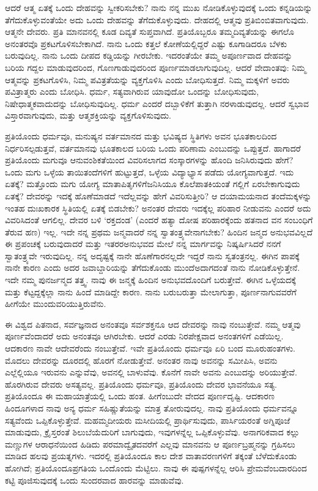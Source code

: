 ಆದರೆ ಆತ್ಮ ಏತಕ್ಕೆ ಒಂದು ದೇಹವನ್ನು ಸ್ವೀಕರಿಸಬೇಕು? ನಾನು ನನ್ನ ಮುಖ ನೋಡಿಕೊಳ್ಳುವುದಕ್ಕೆ ಒಂದು ಕನ್ನಡಿಯನ್ನು ತೆಗೆದುಕೊಳ್ಳುವಂತೆಯೇ ಅದು ಒಂದು ದೇಹವನ್ನು ತೆಗೆದುಕೊಳ್ಳುವುದು. ದೇಹದಲ್ಲಿ ಆತ್ಮವು ಪ್ರತಿಬಿಂಬಿತವಾಗುವುದು. ಆತ್ಮನೇ ದೇವರು. ಪ್ರತಿ ಮಾನವನಲ್ಲಿ ಕೂಡ ದಿವ್ಯತೆ ಸುಪ್ತವಾಗಿದೆ. ಪ್ರತಿಯೊಬ್ಬರೂ ತಮ್ಮ\break ದಿವ್ಯತೆಯನ್ನು ಈಗಲೊ ಅನಂತರವೊ ಪ್ರಕಟಗೊಳಿಸಬೇಕಾಗಿದೆ. ನಾನು ಒಂದು ಕತ್ತಲೆ ಕೋಣೆಯಲ್ಲಿದ್ದರೆ ಎಷ್ಟು ಕೂಗಾಡಿದರೂ ಬೆಳಕು ಬರುವುದಿಲ್ಲ. ನಾನು ಒಂದು ದೀಪದ ಕಡ್ಡಿಯನ್ನು ಗೀರಬೇಕು. ಇದರಂತೆಯೇ ತಮ್ಮ ಅಪೂರ್ಣವಾದ ದೇಹವನ್ನು ಬರಿಯ ಗದ್ದಲ ಮಾಡುವುದರಿಂದ, ಗೊಣಗಾಡುವುದರಿಂದ ಪೂರ್ಣಮಾಡಲಾಗುವುದಿಲ್ಲ. ಆದರೆ ವೇದಾಂತವು: ನಿಮ್ಮ ಆತ್ಮವನ್ನು ಪ್ರಕಟಗೊಳಿಸಿ, ನಿಮ್ಮ ಪವಿತ್ರತೆಯನ್ನು ವ್ಯಕ್ತಗೊಳಿಸಿ ಎಂದು ಬೋಧಿಸುತ್ತದೆ. ನಿಮ್ಮ ಮಕ್ಕಳಿಗೆ ಅವರು ಪವಿತ್ರಾತ್ಮರು ಎಂದು ಬೋಧಿಸಿ. ಧರ್ಮ, ಸತ್ಯವಾಗಿರುವ ಯಾವುದೋ ಒಂದನ್ನು ಬೋಧಿಸುವುದು, ನಿಷೇಧಾತ್ಮಕವಾದುದನ್ನು ಬೋಧಿಸುವುದಿಲ್ಲ. ಧರ್ಮ ಎಂದರೆ ದಬ್ಬಾಳಿಕೆಗೆ ತುತ್ತಾಗಿ ನರಳಾಡುವುದಲ್ಲ. ಆದರೆ ಸ್ವಭಾವ ವಿಸ್ತಾರವಾಗುವುದು, ಮತ್ತು ಆತ್ಮಶಕ್ತಿಯನ್ನು ವ್ಯಕ್ತಗೊಳಿಸುವುದು.

ಪ್ರತಿಯೊಂದು ಧರ್ಮವೂ, ಮನುಷ್ಯನ ವರ್ತಮಾನದ ಮತ್ತು ಭವಿಷ್ಯದ ಸ್ಥಿತಿಗಳು ಅವನ ಭೂತಕಾಲದಿಂದ ನಿರ್ಧರಿಸಲ್ಪಡುತ್ತವೆ, ವರ್ತಮಾನವು ಭೂತಕಾಲದ ಬರಿಯ ಒಂದು ಪರಿಣಾಮ ಎಂಬುದನ್ನು ಒಪ್ಪುತ್ತದೆ. ಹಾಗಾದರೆ ಪ್ರತಿಯೊಂದು ಮಗುವೂ ಆನುವಂಶಿಕತೆಯಿಂದ ವಿವರಿಸಲಾಗದ ಸಂಸ್ಕಾರಗಳನ್ನು ಹೊಂದಿ ಜನಿಸಿರುವುದು ಹೇಗೆ? ಒಂದು ಮಗು ಒಳ್ಳೆಯ ತಾಯಿತಂದೆಗಳಿಗೆ ಹುಟ್ಟುತ್ತದೆ, ಒಳ್ಳೆಯ ವಿದ್ಯಾಭ್ಯಾಸ ಪಡೆದು ಯೋಗ್ಯವಾಗುತ್ತದೆ. ಇದು ಏತಕ್ಕೆ? ಮತ್ತೊಂದು ಮಗು ಯೋಗ್ಯ ಮಾತಾಪಿತೃಗಳಿಗೆ\break ಜನಿಸಿಯೂ ಕೊಲೆಪಾತಕಿಯಂತೆ ಗಲ್ಲಿಗೆ ಏರಬೇಕಾಗುವುದು ಏತಕ್ಕೆ? ದೇವರನ್ನು ಇದಕ್ಕೆ ಹೊಣೆಮಾಡದೆ ಇದೆಲ್ಲವನ್ನು ಹೇಗೆ ವಿವರಿಸುತ್ತೀರಿ? ಆ ದಯಾಮಯನಾದ ತಂದೆ\break ಮಕ್ಕಳನ್ನು ಇಂತಹ ದುಃಖಕಾರಕ ಸ್ಥಿತಿಯಲ್ಲಿ ಏತಕ್ಕೆ ಬಿಡಬೇಕು? ಅನಂತರ ದೇವರು ಇದಕ್ಕೆಲ್ಲ ಪರಿಹಾರ ನೀಡುವನು ಎಂದರೆ ಅದು ವಿವರಿಸಿದಂತೆ ಆಗಲಿಲ್ಲ. ದೇವರ ಬಳಿ ‘ರಕ್ತದಂಡ’ (ಎಂದರೆ ಹತ್ಯಾ ದೋಷ ಪರಿಹಾರಕ್ಕೆಂದು ಹತನಾದ ವನ ಸಂಬಂಧಿಗೆ ತೆರುವ ಹಣ) ಇಲ್ಲ. ಇದೇ ನನ್ನ ಪ್ರಥಮ ಜನ್ಮವಾದರೆ ನನ್ನ ಸ್ವಾತಂತ್ರ್ಯವೇನಾಗಬೇಕು? ಹಿಂದಿನ ಜನ್ಮದ ಅನುಭವವಿಲ್ಲದೆ ಈ ಪ್ರಪಂಚಕ್ಕೆ ಬರುವುದಾದರೆ ಮತ್ತು ಇತರರ\break ಅನುಭವದ ಮೇಲೆ ನನ್ನ ಮಾರ್ಗವನ್ನು ನಿಷ್ಕರ್ಷಿಸಿದರೆ ನನಗೆ ಸ್ವಾತಂತ್ರ್ಯವೇ ಇರುವುದಿಲ್ಲ. ನನ್ನ ಅದೃಷ್ಟಕ್ಕೆ ನಾನೇ ಹೊಣೆಗಾರನಲ್ಲದೇ ಇದ್ದರೆ ನಾನು ಸ್ವತಂತ್ರನಲ್ಲ. ಈಗಿನ ಪಾಪಕ್ಕೆ ನಾನೇ ಕಾರಣ ಎಂದು ಅದರ ಜವಾಬ್ದಾರಿಯನ್ನು ತೆಗೆದುಕೊಂಡು ಮುಂದೆ\break ಅದಾಗದಂತೆ ನಾನು ನೋಡಿಕೊಳ್ಳುತ್ತೇನೆ. ಇದೇ ನಮ್ಮ ಪುನರ್ಜನ್ಮದ ತತ್ತ್ವ. ನಾವು ಈ ಜನ್ಮಕ್ಕೆ ಹಿಂದಿನ ಅನುಭವದೊಂದಿಗೆ ಬರುತ್ತೇವೆ. ಈಗಿನ ಒಳ್ಳೆಯದಕ್ಕೆ ಮತ್ತು ಕೆಟ್ಟದ್ದಕ್ಕೆಲ್ಲಾ ನಾನು ಹಿಂದೆ ಮಾಡಿದ್ದೇ ಕಾರಣ. ನಾನು ಬರುಬರುತ್ತಾ ಮೇಲಾಗುತ್ತಾ, ಪೂರ್ಣನಾಗುವವರೆಗೆ ಹೀಗೆಯೇ ಮುಂದುವರಿಯುತ್ತಿರುವೆನು.

ಈ ವಿಶ್ವದ ಪಿತನಾದ, ಸರ್ವಜ್ಞನಾದ ಅನಂತವೂ ಸರ್ವಶಕ್ತನೂ ಆದ ದೇವರನ್ನು ನಾವು ನಂಬುತ್ತೇವೆ. ನಮ್ಮ ಆತ್ಮವು ಪೂರ್ಣವೆಂದಾದರೆ ಅದು ಅನಂತವೂ ಆಗಿರಬೇಕು. ಆದರೆ ಎರಡು ನಿರಪೇಕ್ಷವಾದ ಅನಂತಗಳಿಗೆ ಎಡೆಯಿಲ್ಲ. ಆದಕಾರಣ ನಾವೇ ಆ\break ದೇವರೆಂದು ನಂಬುತ್ತೇವೆ. ಇವೇ ಪ್ರತಿಯೊಂದು ಧರ್ಮವೂ ಏರಿ ಬಂದ ಮೂರು\break ಹಂತಗಳು. ಮೊದಲು ದೇವರನ್ನು ದೂರದಲ್ಲಿ ಹೊರಗೆ ನೋಡುತ್ತೇವೆ. ಅನಂತರ ನಾವು ಅವನನ್ನು ಸಮೀಪಿಸಿ, ಅವನು ಎಲ್ಲೆಲ್ಲಿಯೂ ಇರುವನು ಎನ್ನುವೆವು, ಅವನಲ್ಲಿ ಬಾಳುವೆವು. ಕೊನೆಗೆ ನಾವೇ ಅವನು ಎಂಬುದನ್ನು ಅರಿಯುತ್ತೇವೆ. ಹೊರಗಿರುವ ದೇವರು ಅಸತ್ಯವಲ್ಲ. ಪ್ರತಿಯೊಂದು ಧರ್ಮವೂ, ಪ್ರತಿಯೊಂದು ದೇವರ ಭಾವನೆಯೂ ಸತ್ಯ. ಪ್ರತಿಯೊಂದೂ ಈ ಮಹಾಯಾತ್ರೆಯಲ್ಲಿ ಒಂದು ಹಂತ. ಹೀಗೆಂಬುದೇ ವೇದದ ಪೂರ್ಣದೃಷ್ಟಿ. ಆದಕಾರಣ ಹಿಂದೂಗಳಾದ ನಾವು ಅನ್ಯ ಧರ್ಮ ಸಹಿಷ್ಣುತೆಯನ್ನು ಮಾತ್ರ ತೋರುವುದಲ್ಲ. ನಾವು ಪ್ರತಿಯೊಂದು ಧರ್ಮವನ್ನೂ ಸತ್ಯವೆಂದು ಒಪ್ಪಿಕೊಳ್ಳುತ್ತೇವೆ. ಮಹಮ್ಮದೀಯರು ಮಸೀದಿಯಲ್ಲಿ ಪ್ರಾರ್ಥಿಸುವುದು, ಪಾರ್ಸಿಯರಂತೆ ಅಗ್ನಿಪೂಜೆ ಮಾಡುವುದು, ಕ್ರೈಸ್ತರಂತೆ ಶಿಲುಬೆಯೆದುರಿಗೆ ಬಾಗುವುದು, ಇವುಗಳನ್ನೆಲ್ಲ ಒಪ್ಪಿಕೊಳ್ಳುವೆವು. ಅನಾಗರಿಕವಾದ ಕಲ್ಲು ಮಣ್ಣುಗಳ ಆರಾಧನೆಯಿಂದ ಹಿಡಿದು ಪರಮಾದ್ವೈತದವರೆಗೆ ಎಲ್ಲವು ಮಾನವನು ಆ ಪೂರ್ಣಬ್ರಹ್ಮನನ್ನು ಗ್ರಹಿಸಲು ಮಾಡಿದ ಹಲವು ಪ್ರಯತ್ನಗಳು. ಇದರಲ್ಲಿ ಪ್ರತಿಯೊಂದೂ ಕಾಲ ದೇಶ ವಾತಾವರಣಗಳಿಗೆ ತಕ್ಕಂತೆ ಬೆಳೆದುಕೊಂಡು ಹೋಗಿದೆ; ಪ್ರತಿಯೊಂದೂ\break ಪ್ರಗತಿಯ ಒಂದೊಂದು ಮೆಟ್ಟಿಲು. ನಾವು ಈ ಪುಷ್ಪಗಳನ್ನೆಲ್ಲ ಆರಿಸಿ ಪ್ರೇಮವೆಂಬ\break ದಾರದಿಂದ ಕಟ್ಟಿ ಪೂಜಿಸುವುದಕ್ಕೆ ಒಂದು ಸುಂದರವಾದ ಹಾರವನ್ನು ಮಾಡುವೆವು.

